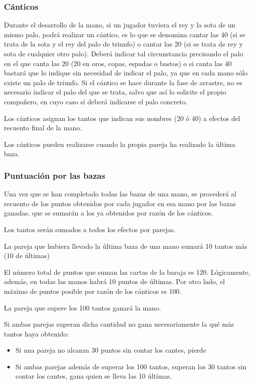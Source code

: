 \documentclass{article}
\begin{document}
\subsubsection*{Cánticos}

Durante el desarrollo de la mano, si un jugador tuviera el rey y la sota de un mismo palo, podrá realizar un cántico, es lo que se denomina cantar las 40 (si se trata de la sota y el rey del palo de triunfo) o cantar las 20 (si se trata de rey y sota de cualquier otro palo). Deberá indicar tal circunstancia precisando el palo en el que canta las 20 (20 en oros, copas, espadas o bastos) o si canta las 40 bastará que lo indique sin necesidad de indicar el palo, ya que en cada mano sólo existe un palo de triunfo. Si el cántico se hace durante la fase de arrastre, no es necesario indicar el palo del que se trata, salvo que así lo solicite el propio compañero, en cuyo caso sí deberá indicarse el palo concreto.

Los cánticos asignan los tantos que indican sus nombres (20 ó 40) a efectos del recuento final de la mano.

Los cánticos pueden realizarse cuando la propia pareja ha realizado la última baza.

\subsubsection*{Puntuación por las bazas}

Una vez que se han completado todas las bazas de una mano, se procederá al recuento de los puntos obtenidos por cada jugador en esa mano por las bazas ganadas, que se sumarán a los ya obtenidos por razón de los cánticos.

Los tantos serán sumados a todos los efectos por parejas.

La pareja que hubiera llevado la última baza de una mano sumará 10 tantos más (10 de últimas)

El número total de puntos que suman las cartas de la baraja es 120. Lógicamente, además, en todas las manos habrá 10 puntos de últimas. Por otro lado, el máximo de puntos posible por razón de los cánticos es 100.

La pareja que supere los 100 tantos ganará la mano.

Si ambas parejas superan dicha cantidad no gana necesariamente la qué más tantos haya obtenido:

\begin{itemize}
	\item Si una pareja no alcanza 30 puntos sin contar los cantes, pierde
	\item Si ambas parejas además de superar los 100 tantos, superan los 30 tantos sin contar los cantes, gana quien se lleva las 10 últimas.
\end{itemize}
\end{document}
